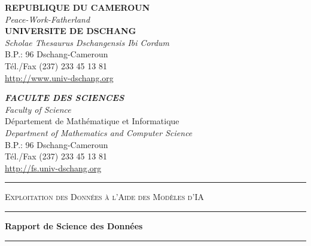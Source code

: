 \thispagestyle{empty}

\begin{center}

\begin{minipage}[t]{0.44\textwidth}
  \centering
  \textbf{REPUBLIQUE DU CAMEROUN}\\
  \textit{Peace-Work-Fatherland}\\[4pt]
  \textbf{UNIVERSITE DE DSCHANG}\\
  \small\textit{Scholae Thesaurus Dschangensis Ibi Cordum}\\[8pt]
  \small B.P.: 96 Dschang-Cameroun\\
  \small Tél./Fax (237) 233 45 13 81\\
  \small \url{http://www.univ-dschang.org}
\end{minipage}
\hfill
\begin{minipage}[t]{0.44\textwidth}
  \centering
  \textbf{\textit{FACULTE DES SCIENCES}}\\
  \textit{Faculty of Science}\\[4pt]
  \small Département de Mathématique et Informatique\\
  \small \textit{Department of Mathematics and Computer Science}\\[8pt]
  \small B.P.: 96 Dschang-Cameroun\\
  \small Tél./Fax (237) 233 45 13 81\\
  \small \url{http://fs.univ-dschang.org}
\end{minipage}

\vspace{1cm}
\noindent\textcolor{maingreen}{\rule{\linewidth}{1.2pt}}
\vspace{0.5cm}

{\fontsize{15}{18}\selectfont\scshape Exploitation des Données à l'Aide des Modèles d'IA}\\[0.4cm]

\noindent\textcolor{maingreen}{\rule{\linewidth}{0.6pt}}
\vspace{0.6cm}

{\Huge\bfseries\color{darkblue} Rapport de Science des Données}\\[0.3cm]
\noindent\textcolor{maingreen}{\rule{\linewidth}{0.6pt}}

\vspace{1.2cm}


\end{center}
